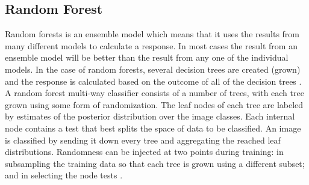 \documentclass[12pt]{article}
\numberwithin{equation}{section}
\numberwithin{table}{section}
\numberwithin{figure}{section}
\begin{document}


\subsection{Random Forest} \label{randomf}

Random forests is an ensemble model which means that it uses the results from many different models to calculate a response. In most cases the result from an ensemble model will be better than the result from any one of the individual models. In the case of random forests, several decision trees are created (grown) and the response is calculated based on the outcome of all of the decision trees \cite{Horning2010}.   A random forest multi-way classifier consists of a number of trees, with each tree grown using some form of randomization. The leaf nodes of each tree are labeled by estimates of the posterior distribution over the image classes. Each internal node contains a test that best splits the space of data to be classified. An image is classified by sending it down every tree and aggregating the reached leaf distributions. Randomness can be injected at two points during training: in subsampling the training data so that each tree is grown using a different subset; and in selecting the node tests \cite{Bosch2007}.
\end{document}
